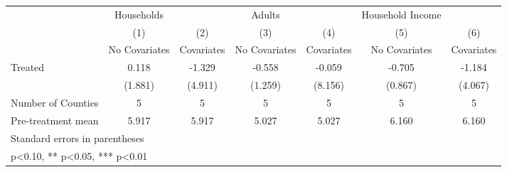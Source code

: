{
\def\sym#1{\ifmmode^{#1}\else\(^{#1}\)\fi}
\begin{tabular}{l*{6}{c}}
\hline\hline
            &  Households   &               &      Adults   &               &Household Income   &               \\
            &\multicolumn{1}{c}{(1)}&\multicolumn{1}{c}{(2)}&\multicolumn{1}{c}{(3)}&\multicolumn{1}{c}{(4)}&\multicolumn{1}{c}{(5)}&\multicolumn{1}{c}{(6)}\\
            &\multicolumn{1}{c}{No Covariates}&\multicolumn{1}{c}{Covariates}&\multicolumn{1}{c}{No Covariates}&\multicolumn{1}{c}{Covariates}&\multicolumn{1}{c}{No Covariates}&\multicolumn{1}{c}{Covariates}\\
\hline
Treated     &       0.118   &      -1.329   &      -0.558   &      -0.059   &      -0.705   &      -1.184   \\
            &     (1.881)   &     (4.911)   &     (1.259)   &     (8.156)   &     (0.867)   &     (4.067)   \\
\hline
Number of Counties&           5   &           5   &           5   &           5   &           5   &           5   \\
Pre-treatment mean&       5.917   &       5.917   &       5.027   &       5.027   &       6.160   &       6.160   \\
\hline\hline
\multicolumn{7}{l}{\footnotesize Standard errors in parentheses}\\
\multicolumn{7}{l}{\footnotesize * p<0.10, ** p<0.05, *** p<0.01}\\
\end{tabular}
}
